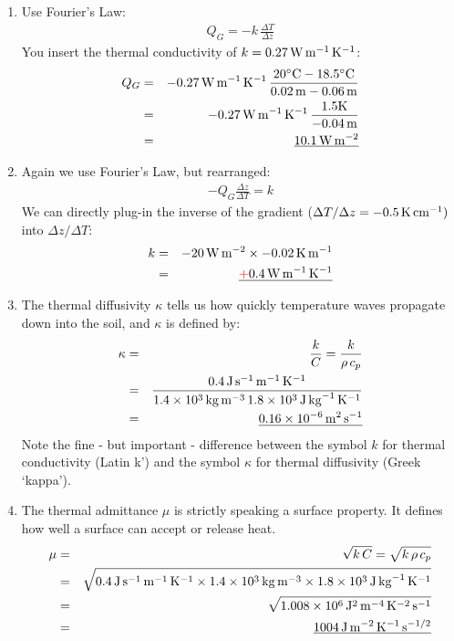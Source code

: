 \documentclass[11pt]{article}
\begin{document}
\begin{enumerate}
\item Use Fourier's Law:
\begin{eqnarray*} 
Q_G = - k\, \frac{\Delta T}{\Delta z}
\end{eqnarray*} 
You insert the thermal conductivity of $k = 0.27\,\rm{W}\,\rm{m}^{-1}\,\rm{K}^{-1}$:
\begin{eqnarray*} 
Q_G &=& - 0.27\,\rm{W}\,\rm{m}^{-1}\,\rm{K}^{-1}\, \frac{20\rm{^{\circ}C}-18.5\rm{^{\circ}C}}{0.02\,\rm{m} - 0.06\,\rm{m}} \\
&=& - 0.27\,\rm{W}\,\rm{m}^{-1}\,\rm{K}^{-1}\, \frac{1.5\rm{K}}{-0.04\,\rm{m}} \\
&=& \underline{10.1\,\rm{W}\,\rm{m}^{-2}}
\end{eqnarray*} 

\item Again we use Fourier's Law, but rearranged:
\begin{eqnarray*} 
- Q_G \frac{\Delta z}{\Delta T} = k 
\end{eqnarray*} 
We can directly plug-in the inverse of the gradient ($\Delta T/\Delta z = -0.5\, \rm{K}\,\rm{cm}^{-1})$ into $\Delta z/\Delta T$:
\begin{eqnarray*} 
k &=&  -20\,\rm{W}\,\rm{m}^{-2} \times -0.02\, \rm{K}\,\rm{m}^{-1} \\
&=& \underline{\textcolor{red}{+} 0.4\,\rm{W}\,\rm{m}^{-1}\,\rm{K}^{-1}}
\end{eqnarray*} 

\item The thermal diffusivity $\kappa$ tells us how quickly temperature waves propagate down into the soil, and $\kappa$ is defined by:
\begin{eqnarray*} 
\kappa &=& \frac{k}{C} = \frac{k}{\rho\,c_p} \\
&=& \frac{0.4\,\rm{J}\,\rm{s}^{-1}\,\rm{m}^{-1}\,\rm{K}^{-1}}{1.4\times 10^{3}\, \rm{kg}\, \rm{m}^{-3}\,1.8 \times 10^{3}\,\rm{J}\,\rm{kg}^{-1}\,\rm{K}^{-1}} \\
&=& \underline{0.16 \times 10^{-6}\,\rm{m}^{2}\,\rm{s}^{-1}}
\end{eqnarray*} 
Note the fine - but important - difference between the symbol $k$ for thermal conductivity (Latin k') and the symbol $\kappa$ for thermal diffusivity (Greek `kappa').

\item The thermal admittance $\mu$ is strictly speaking a surface property. It defines how well a surface can accept or release heat.
\begin{eqnarray*} 
\mu &=& \sqrt{k\,C} = \sqrt{k\,\rho\, c_p} \\
&=& \sqrt{0.4\,\rm{J}\,\rm{s}^{-1}\,\rm{m}^{-1}\,\rm{K}^{-1} \times 1.4 \times 10^{3}\, \rm{kg}\, \rm{m}^{-3} \times 1.8 \times 10^{3}\,\rm{J}\,\rm{kg}^{-1}\,\rm{K}^{-1}} \\
&=& \sqrt{1.008 \times 10^{6}  \,\rm{J}^{2} \,\rm{m}^{-4} \,\rm{K}^{-2}  \,\rm{s}^{-1}} \\
&=& \underline{1004 \,\rm{J} \,\rm{m}^{-2} \,\rm{K}^{-1} \,\rm{s}^{-1/2}}
\end{eqnarray*} 


\end{enumerate}
\end{document}
